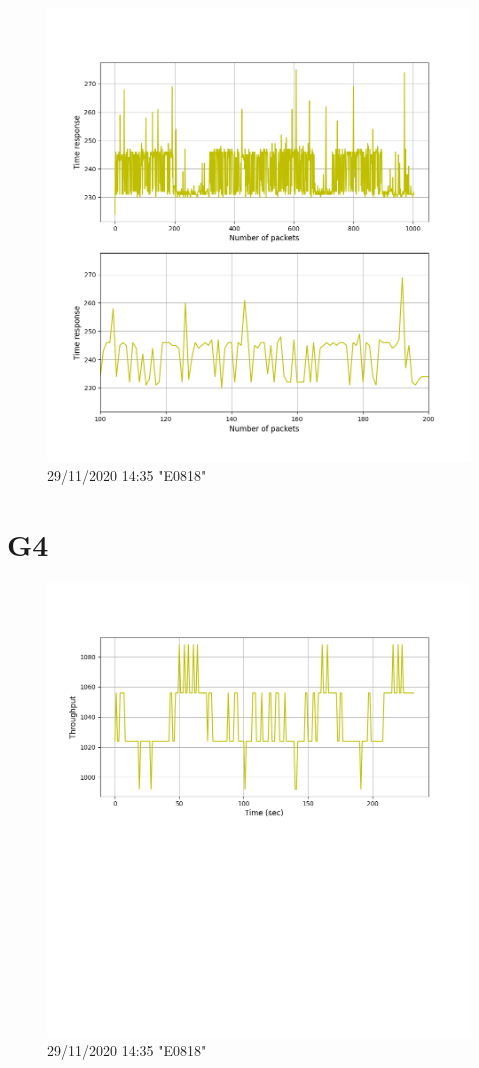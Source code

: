 \documentclass[hidelinks, 12pt, a4paper]{article}
\begin{document}
\begin{figure}[h!]
\centering
	\includegraphics[height=.38\textheight, width=\textwidth]{assets/session2/g3.png}
	\caption{29/11/2020 14:35 "E0818"} 
\end{figure}

\section{G4}

\begin{figure}[h!]
\centering
	\includegraphics[height=.38\textheight, width=\textwidth]{assets/session2/g4.png}
	\caption{29/11/2020 14:35 "E0818"} 
\end{figure}
\end{document}
